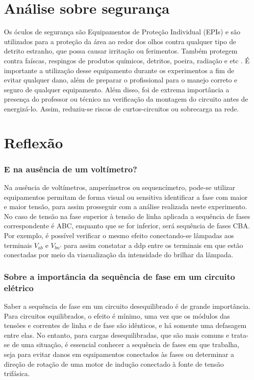 \documentclass[a4paper,12pt,oneside,openany,table,xcdraw]{article}
\begin{document}
\section{Análise sobre segurança} %
Os óculos de segurança são Equipamentos de Proteção Individual (EPIs) e são utilizados para a proteção da área ao redor dos olhos contra qualquer tipo de detrito estranho, que possa causar irritação ou ferimentos. Também protegem contra faíscas, respingos de produtos químicos, detritos, poeira, radiação e etc \cite{safe}.
É importante a utilização desse equipamento durante os experimentos a fim de evitar qualquer dano, além de preparar o profissional para o manejo correto e seguro de qualquer equipamento.
Além disso, foi de extrema importância a presença do professor ou técnico na verificação da montagem do circuito antes de energizá-lo. Assim, reduziu-se riscos de curtos-circuitos ou sobrecarga na rede.

\vspace{0.2cm}
\section{Reflexão} %
\subsubsection{E na ausência de um voltímetro?}
 Na ausência de voltímetros, amperímetros ou sequencímetro, pode-se utilizar equipamentos permitam de forma visual ou sensitiva identificar a fase com maior e maior tensão, para assim prosseguir com a análise realizada neste experimento. No caso de tensão na fase superior à tensão de linha aplicada a sequência de fases correspondente é ABC, enquanto que se for inferior, será sequência de fases CBA.
 Por exemplo, é possível verificar o mesmo efeito conectando-se lâmpadas aos terminais $V_{ab}$ e $V_{bn'}$ para assim constatar a ddp entre os terminais em que estão conectadas por meio da viasualização da intensidade do brilhar da lâmpada.
 
\subsubsection{Sobre a importância da sequência de fase em um circuito elétrico}
Saber a sequência de fase em um circuito desequilibrado é de grande importância. Para circuitos equilibrados, o efeito é mínimo, uma vez que os módulos das tensões e correntes de linha e de fase são idênticos, e há somente uma defasagem entre elas. No entanto, para cargas desequilibradas, que são mais comuns e trata-se de uma situação, é essencial conhecer a sequência de fases em que trabalha, seja para evitar danos em equipamentos conectados às fases ou determinar a direção de
rotação de uma motor de indução
conectado à fonte de tensão trifásica.
\end{document}
